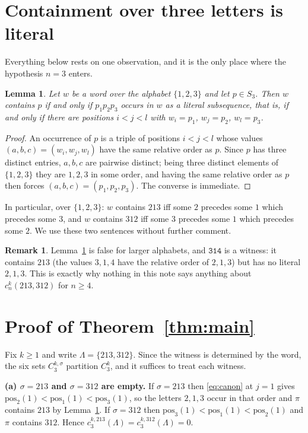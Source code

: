 \documentclass[11pt]{amsart}
\newtheorem{lemma}[theorem]{Lemma}
\theoremstyle{definition}
\newtheorem{remark}[theorem]{Remark}
\newcommand{\wrd}[1]{\texttt{#1}}
\begin{document}
\section{Containment over three letters is literal}

Everything below rests on one observation, and it is the only place where the
hypothesis $n=3$ enters.

\begin{lemma}\label{lem:literal}
Let $w$ be a word over the alphabet $\{1,2,3\}$ and let $p\in S_3$. Then $w$
contains $p$ if and only if $p_1p_2p_3$ occurs in $w$ as a literal subsequence,
that is, if and only if there are positions $i<j<l$ with $w_i=p_1$, $w_j=p_2$,
$w_l=p_3$.
\end{lemma}

\begin{proof}
An occurrence of $p$ is a triple of positions $i<j<l$ whose values
$(a,b,c)=(w_i,w_j,w_l)$ have the same relative order as $p$. Since $p$ has
three distinct entries, $a,b,c$ are pairwise distinct; being three distinct
elements of $\{1,2,3\}$ they are $1,2,3$ in some order, and having the same
relative order as $p$ then forces $(a,b,c)=(p_1,p_2,p_3)$. The converse is
immediate.
\end{proof}

In particular, over $\{1,2,3\}$: $w$ contains $213$ iff some $2$ precedes some
$1$ which precedes some $3$, and $w$ contains $312$ iff some $3$ precedes some
$1$ which precedes some $2$. We use these two sentences without further
comment.

\begin{remark}\label{rem:n4}
Lemma~\ref{lem:literal} is false for larger alphabets, and $\wrd{314}$ is a
witness: it contains $213$ (the values $3,1,4$ have the relative order of
$2,1,3$) but has no literal $2,1,3$. This is exactly why nothing in this note
says anything about $c_n^k(213,312)$ for $n\ge4$.
\end{remark}

\section{Proof of Theorem~\ref{thm:main}}

Fix $k\ge1$ and write $\Lambda=\{213,312\}$. Since the witness is determined by
the word, the six sets $C_3^{k,\sigma}$ partition $C_3^k$, and it suffices to
treat each witness.

\smallskip\noindent
\textbf{(a) $\sigma=213$ and $\sigma=312$ are empty.}
If $\sigma=213$ then \eqref{eq:canon} at $j=1$ gives
$\mathrm{pos}_2(1)<\mathrm{pos}_1(1)<\mathrm{pos}_3(1)$, so the letters
$2,1,3$ occur in that order and $\pi$ contains $213$ by
Lemma~\ref{lem:literal}. If $\sigma=312$ then
$\mathrm{pos}_3(1)<\mathrm{pos}_1(1)<\mathrm{pos}_2(1)$ and $\pi$ contains
$312$. Hence $c_3^{k,213}(\Lambda)=c_3^{k,312}(\Lambda)=0$.
\end{document}
